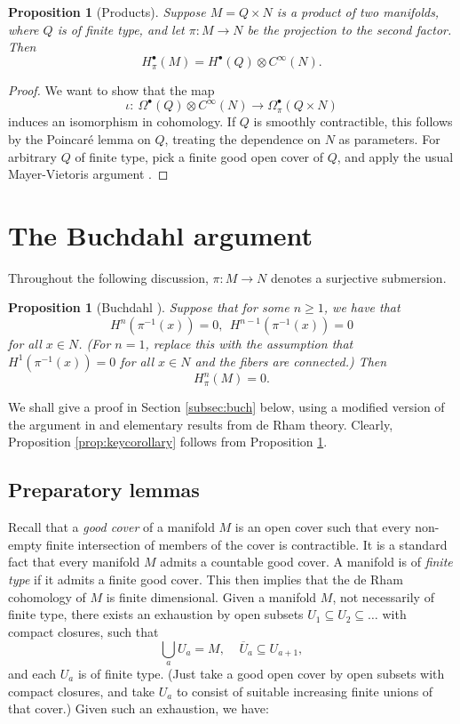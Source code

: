 \documentclass[11pt]{amsart}
\newtheorem{proposition}[theorem]{Proposition}
\theoremstyle{definition}
\theoremstyle{remark}
\newcommand{\ol}{\overline}
\renewcommand{\subset}{\subseteq}
\begin{document}
\begin{proposition}[Products] \label{prop:product}
	Suppose $M=Q\times N$ 	is a product of two manifolds, where $Q$ is of finite type, and let $\pi\colon M\to N$ be the projection to the second factor. 
	Then 
	\[ H_\pi^\bullet(M)=H^\bullet(Q)\otimes C^\infty(N).\]
\end{proposition}
\begin{proof}
	We want to show that the map 
	\begin{equation}\label{eq:themap}
		\iota\colon\	\Omega^\bullet(Q)\otimes C^\infty(N)\to \Omega^\bullet_\pi(Q\times N)
	\end{equation}
	induces an isomorphism in cohomology.
	If $Q$ is smoothly contractible, this follows by  the Poincar\'{e} lemma on $Q$, treating the dependence on $N$ as parameters. For arbitrary $Q$ of finite type, pick a finite good open cover of $Q$, and apply the usual Mayer-Vietoris argument \cite{bo:di}. 
\end{proof}





\section{The Buchdahl argument}\label{app:buch}
%
Throughout the following discussion, $\pi\colon M\to N$ denotes a surjective submersion. 
%
\begin{proposition}[Buchdahl \cite{buc:rel}]\label{prop:buch}
	Suppose that for some $n\ge 1$, we have that 
	\[H^n(\pi^{-1}(x))=0,\ \ H^{n-1}(\pi^{-1}(x))=0
	\]
	for all $x\in N$. (For $n=1$, replace this with the assumption that $H^1(\pi^{-1}(x))=0$ for all $x\in N$ and  the fibers are connected.) 
	Then 
	\[H^n_\pi(M)=0.\]  
\end{proposition}
%
We shall give a proof in Section \ref{subsec:buch} below, using a modified version of the argument in \cite{buc:rel} and elementary results from de Rham theory.  Clearly, Proposition \ref{prop:keycorollary} follows from Proposition \ref{prop:buch}. 

\subsection{Preparatory lemmas}
Recall \cite{bo:di} that a \emph{good cover}  of a manifold $M$ is an open
cover such that every non-empty finite intersection of members of the
cover is contractible. It is a standard fact \cite{gr:co1} that every manifold $M$ admits 
a countable good cover. A manifold is of \emph{finite type} if it admits a finite good cover. This then implies that the de Rham cohomology of $M$ is finite dimensional. 
Given a manifold $M$, not necessarily of finite type, there exists an exhaustion by open subsets $U_1\subset U_2\subset \ldots$ with compact closures, such that 
\[ \bigcup_a U_a=M, \ \ \ \ \ \ol{U}_a\subset U_{a+1},\] 
and each $U_a$ is of finite type. (Just take a good open cover by open subsets with compact closures, and take $U_a$ to 
consist of suitable increasing finite unions of that cover.) Given such an exhaustion, we have: 
\end{document}
